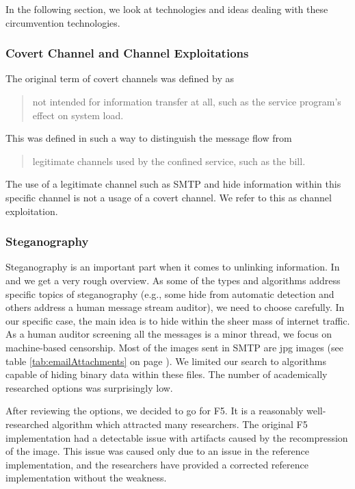 In the following section, we look at technologies and ideas dealing with these circumvention technologies.

\subsubsection{Covert Channel and Channel Exploitations}
The original term of covert channels was defined by \citeauthor{Lampson73anote}\cite{Lampson73anote} as 

\begin{quote}
	not intended for information transfer at all, such as the service program's effect on system load.
\end{quote}

This was defined  in such a way to distinguish the message flow from 

\begin{quote}
	legitimate channels used by the confined service, such as the bill.
\end{quote}

The use of a legitimate channel such as SMTP and hide information within this specific channel is not a usage of a covert channel. We refer to this as channel exploitation.

\subsubsection{Steganography}

Steganography is an important part when it comes to unlinking information. In \cite{6828087} and \cite{subhedar2014current} we get a very rough overview. As some of the types and algorithms address specific topics of steganography (e.g., some hide from automatic detection and others address a human message stream auditor), we need to choose carefully. In our specific case, the main idea is to hide within the sheer mass of internet traffic. As a human auditor screening all the messages is a minor thread, we focus on machine-based censorship. Most of the images sent in SMTP are jpg images (see table \ref{tab:emailAttachments} on page \pageref{tab:emailAttachments}). We limited our search to algorithms capable of hiding binary data within these files. The number of academically researched options was surprisingly low.

After reviewing the options, we decided to go for F5\cite{f5}. It is a reasonably well-researched algorithm which attracted many researchers. The original F5 implementation had a detectable issue with artifacts\cite{F5broken} caused by the recompression of the image. This issue was caused only due to an issue in the reference implementation, and the researchers have provided a corrected reference implementation without the weakness.

